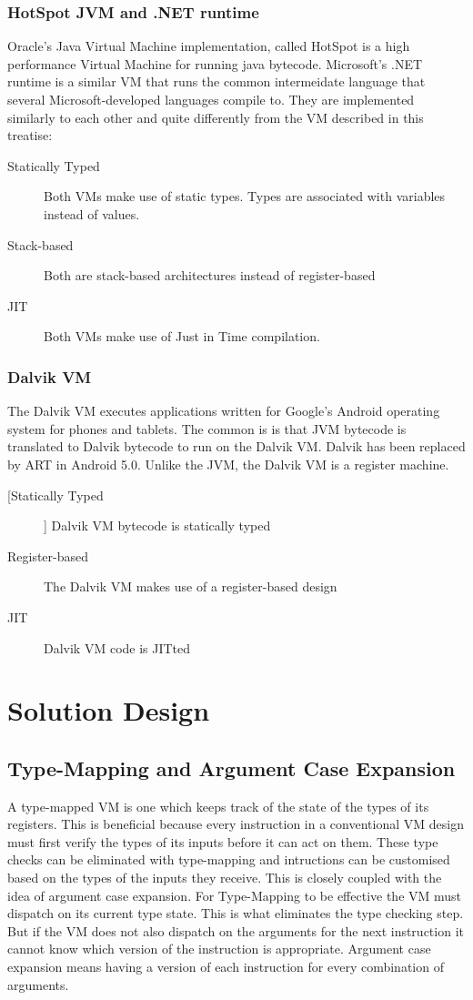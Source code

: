 \documentclass[english,a4paper]{article}
\begin{document}
\subsubsection{HotSpot JVM and .NET runtime}
Oracle's Java Virtual Machine implementation, called HotSpot is a
high performance Virtual Machine for running java
bytecode. Microsoft's .NET runtime is a similar VM that runs the
common intermeidate language that several Microsoft-developed
languages compile to. They are implemented similarly to each other and
quite differently from the VM described in this treatise:
\begin{description}
\item[Statically Typed] Both VMs make use of static types. Types are
  associated with variables instead of values.
\item[Stack-based] Both are stack-based architectures instead of
  register-based
\item[JIT] Both VMs make use of Just in Time compilation.
\end{description}

\subsubsection{Dalvik VM}
The Dalvik VM executes applications written for Google's Android
operating system for phones and tablets. The common is is that JVM
bytecode is translated to Dalvik bytecode to run on the Dalvik
VM. Dalvik has been replaced by ART in Android 5.0. Unlike the JVM,
the Dalvik VM is a register machine.
\begin{description}
\item[[Statically Typed]] Dalvik VM bytecode is statically typed
\item[Register-based] The Dalvik VM makes use of a register-based
  design
\item[JIT] Dalvik VM code is JITted
\end{description}

\section{Solution Design}

\subsection{Type-Mapping and Argument Case Expansion}

A type-mapped VM is one which keeps track of the state of the types of
its registers. This is beneficial because every instruction in a
conventional VM design must first verify the types of its inputs
before it can act on them. These type checks can be eliminated with
type-mapping and intructions can be customised based on the types of
the inputs they receive. This is closely coupled with the idea of
argument case expansion. For Type-Mapping to be effective the VM must
dispatch on its current type state. This is what eliminates the type
checking step. But if the VM does not also dispatch on the arguments
for the next instruction it cannot know which version of the
instruction is appropriate. Argument case expansion means having a
version of each instruction for every combination of arguments.
\end{document}
